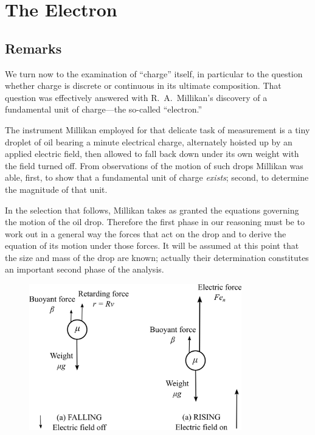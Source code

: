 \chapter{The Electron}



\section*{Remarks}

\indent
We turn now to the examination of ``charge'' itself, in particular to
the question whether charge is discrete or continuous in its ultimate
composition. That question was ef\-fec\-tive\-ly answered with R.\ A.\ 
Millikan's discovery of a fundamental unit of charge---the so-called
``electron.''

The instrument Millikan employed for that delicate task of measurement
is a tiny droplet of oil bearing a minute electrical charge, alternately
hoisted up by an applied electric field, then allowed to fall back down
under its own weight with the field turned off. From observations of the
motion of such drops Millikan was able, first, to show that a
fundamental unit of charge \emph{exists}; second, to determine the
magnitude of that unit.

In the selection that follows, Millikan takes as granted the equations
governing the motion of the oil drop. Therefore the first phase in our
reasoning must be to work out in a general way the forces that act on
the drop and to derive the equation of its motion under those forces. It
will be assumed at this point that the size and mass of the drop are
known; actually their determination constitutes an important second
phase of the analysis.

\begin{figure}[h]
  \begin{center}
    \includegraphics[width=3.63667in]{images/03_millikan/drops.png}
  \end{center}
\end{figure}


